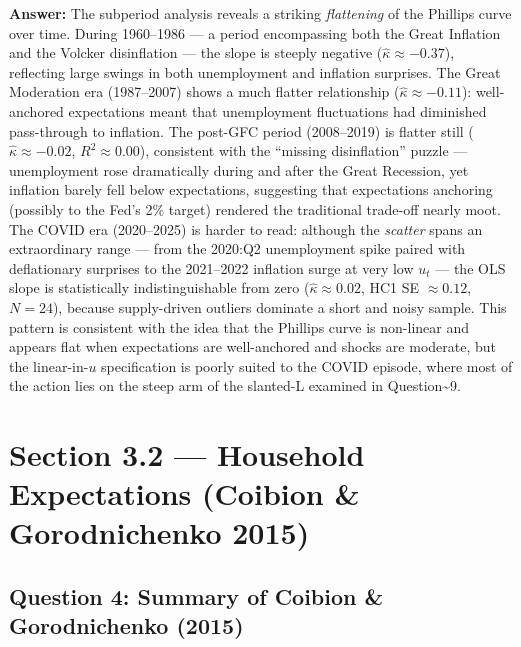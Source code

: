 \documentclass[
  12pt,
]{article}
\begin{document}
\textbf{Answer:} The subperiod analysis reveals a striking
\emph{flattening} of the Phillips curve over time. During 1960--1986 ---
a period encompassing both the Great Inflation and the Volcker
disinflation --- the slope is steeply negative
(\(\hat{\kappa}\approx-0.37\)), reflecting large swings in both
unemployment and inflation surprises. The Great Moderation era
(1987--2007) shows a much flatter relationship
(\(\hat{\kappa}\approx-0.11\)): well-anchored expectations meant that
unemployment fluctuations had diminished pass-through to inflation. The
post-GFC period (2008--2019) is flatter still
(\(\hat{\kappa}\approx-0.02\), \(R^2\approx0.00\)), consistent with the
``missing disinflation'' puzzle --- unemployment rose dramatically
during and after the Great Recession, yet inflation barely fell below
expectations, suggesting that expectations anchoring (possibly to the
Fed's 2\% target) rendered the traditional trade-off nearly moot. The
COVID era (2020--2025) is harder to read: although the \emph{scatter}
spans an extraordinary range --- from the 2020:Q2 unemployment spike
paired with deflationary surprises to the 2021--2022 inflation surge at
very low \(u_t\) --- the OLS slope is statistically indistinguishable
from zero (\(\hat{\kappa}\approx 0.02\), HC1 SE \(\approx 0.12\),
\(N=24\)), because supply-driven outliers dominate a short and noisy
sample. This pattern is consistent with the idea that the Phillips curve
is non-linear and appears flat when expectations are well-anchored and
shocks are moderate, but the linear-in-\(u\) specification is poorly
suited to the COVID episode, where most of the action lies on the steep
arm of the slanted-L examined in Question\textasciitilde9.

\newpage

\hypertarget{section-3.2-household-expectations-coibion-gorodnichenko-2015}{%
\section{Section 3.2 --- Household Expectations (Coibion \&
Gorodnichenko
2015)}\label{section-3.2-household-expectations-coibion-gorodnichenko-2015}}

\hypertarget{question-4-summary-of-coibion-gorodnichenko-2015}{%
\subsection{Question 4: Summary of Coibion \& Gorodnichenko
(2015)}\label{question-4-summary-of-coibion-gorodnichenko-2015}}
\end{document}
